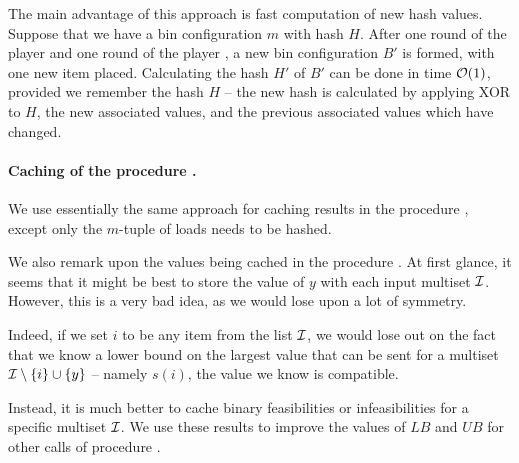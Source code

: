 The main advantage of this approach is fast computation of new hash
values.  Suppose that we have a bin configuration $m$ with hash
$H$. After one round of the player \adversary and one round of the
player \algo, a new bin configuration $B'$ is formed, with one new
item placed. Calculating the hash $H'$ of $B'$ can be done in time
${\mathcal{O}}(1)$, provided we remember the hash $H$ -- the new hash is
calculated by applying XOR to $H$, the new associated values, and the
previous associated values which have changed.

\paragraph{Caching of the procedure \MaxFeas.} We use essentially the
same approach for caching results in the procedure \MaxFeas, except
only the $m$-tuple of loads needs to be hashed.

We also remark upon the values being cached in the procedure \MaxFeas.
At first glance, it seems that it might be best to store the value of
$y$ with each input multiset ${\mathcal I}$. However, this is a very bad
idea, as we would lose upon a lot of symmetry.

Indeed, if we set $i$ to be any item from the list ${\mathcal I}$, we would
lose out on the fact that we know a lower bound on the largest value
that can be sent for a multiset ${\mathcal I} \setminus \{i\} \cup \{y\}$ --
namely $s(i)$, the value we know is compatible.

Instead, it is much better to cache binary feasibilities or
infeasibilities for a specific multiset ${\mathcal I}$. We use these results
to improve the values of $LB$ and $UB$ for other calls of procedure
\MaxFeas.


